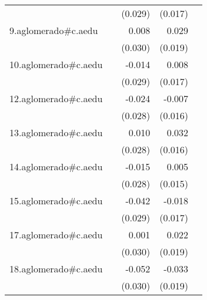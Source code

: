{\begin{longtable}{l*{4}{D{.}{.}{-1}}}
            &                     &     (0.029)         &     (0.017)         &                     \\
\addlinespace
9.aglomerado#c.aedu&                     &       0.008         &       0.029         &                     \\
            &                     &     (0.030)         &     (0.019)         &                     \\
\addlinespace
10.aglomerado#c.aedu&                     &      -0.014         &       0.008         &                     \\
            &                     &     (0.029)         &     (0.017)         &                     \\
\addlinespace
12.aglomerado#c.aedu&                     &      -0.024         &      -0.007         &                     \\
            &                     &     (0.028)         &     (0.016)         &                     \\
\addlinespace
13.aglomerado#c.aedu&                     &       0.010         &       0.032\sym{*}  &                     \\
            &                     &     (0.028)         &     (0.016)         &                     \\
\addlinespace
14.aglomerado#c.aedu&                     &      -0.015         &       0.005         &                     \\
            &                     &     (0.028)         &     (0.015)         &                     \\
\addlinespace
15.aglomerado#c.aedu&                     &      -0.042         &      -0.018         &                     \\
            &                     &     (0.029)         &     (0.017)         &                     \\
\addlinespace
17.aglomerado#c.aedu&                     &       0.001         &       0.022         &                     \\
            &                     &     (0.030)         &     (0.019)         &                     \\
\addlinespace
18.aglomerado#c.aedu&                     &      -0.052         &      -0.033         &                     \\
            &                     &     (0.030)         &     (0.019)         &                     \\

\end{longtable}}
